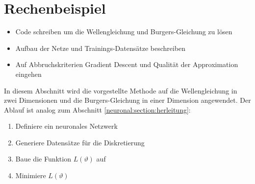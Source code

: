 %
%
%
%

\section{Rechenbeispiel\label{neuronal:section:rechenbeispiel}}

\begin{itemize}
    \item Code schreiben um die Wellengleichung und Burgers-Gleichung zu lösen
    \item Aufbau der Netze und Trainings-Datensätze beschreiben
    \item Auf Abbruchskriterien Gradient Descent und Qualität der Approximation eingehen
\end{itemize}

In diesem Abschnitt wird die vorgestellte Methode auf die Wellengleichung in zwei Dimensionen und die Burgers-Gleichung in einer Dimension angewendet.
Der Ablauf ist analog zum Abschnitt \ref{neuronal:section:herleitung}:
\begin{enumerate}
    \item Definiere ein neuronales Netzwerk
    \item Generiere Datensätze für die Diskretierung
    \item Baue die Funktion $L(\vartheta)$ auf
    \item Minimiere $L(\vartheta)$
\end{enumerate}

